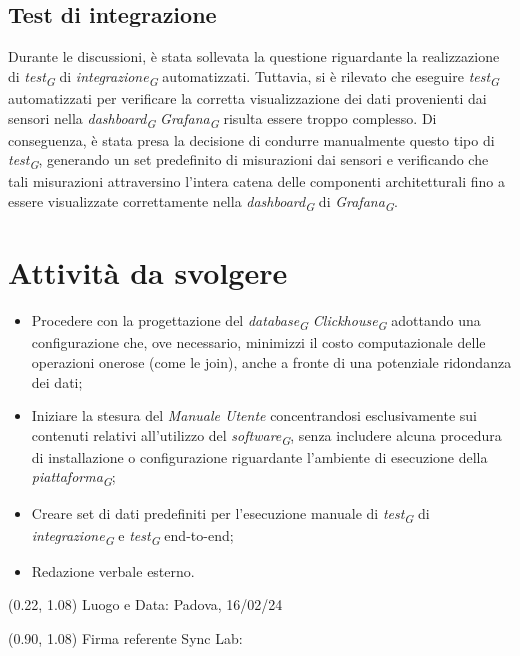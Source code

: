 \documentclass{article}
\begin{document}
    \subsection{Test di integrazione}
    Durante le discussioni, è stata sollevata la questione riguardante la realizzazione di \textit{test}\textsubscript{\textit{G}} di \textit{integrazione}\textsubscript{\textit{G}} automatizzati. Tuttavia, si è rilevato che eseguire \textit{test}\textsubscript{\textit{G}} automatizzati per verificare la corretta visualizzazione dei dati provenienti dai sensori nella \textit{dashboard}\textsubscript{\textit{G}} \textit{Grafana}\textsubscript{\textit{G}} risulta essere troppo complesso. Di conseguenza, è stata presa la decisione di condurre manualmente questo tipo di \textit{test}\textsubscript{\textit{G}}, generando un set predefinito di misurazioni dai sensori e verificando che tali misurazioni attraversino l'intera catena delle componenti architetturali fino a essere visualizzate correttamente nella \textit{dashboard}\textsubscript{\textit{G}} di \textit{Grafana}\textsubscript{\textit{G}}.

\section{Attività da svolgere}
    \begin{itemize}
        \item Procedere con la progettazione del \textit{database}\textsubscript{\textit{G}} \textit{Clickhouse}\textsubscript{\textit{G}} adottando una configurazione che, ove necessario, minimizzi il costo computazionale delle operazioni onerose (come le join), anche a fronte di una potenziale ridondanza dei dati;
        \item Iniziare la stesura del \textit{Manuale Utente} concentrandosi esclusivamente sui contenuti relativi all'utilizzo del \textit{software}\textsubscript{\textit{G}}, senza includere alcuna procedura di installazione o configurazione riguardante l'ambiente di esecuzione della \textit{piattaforma}\textsubscript{\textit{G}};
        \item Creare set di dati predefiniti per l'esecuzione manuale di \textit{test}\textsubscript{\textit{G}} di \textit{integrazione}\textsubscript{\textit{G}} e \textit{test}\textsubscript{\textit{G}} end-to-end;
        \item Redazione verbale esterno.
    \end{itemize}




\begin{textblock*}{\textwidth}(0.22\textwidth, 1.08\textheight)
    Luogo e Data: Padova, 16/02/24
\end{textblock*}

\begin{textblock*}{\textwidth}(0.90\textwidth, 1.08\textheight)
        Firma referente Sync Lab:
\end{textblock*}
\end{document}
